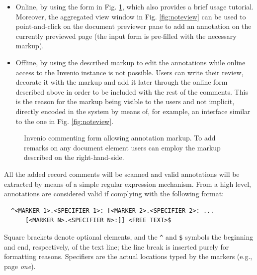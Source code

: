 \begin{itemize}
  \item Online, by using the form in Fig. \ref{fig:noteform}, which also
        provides a brief usage tutorial. Moreover, the aggregated view window in
        Fig. \ref{fig:noteview} can be used to point-and-click on the document
        previewer pane to add an annotation on the currently previewed page (the
        input form is pre-filled with the necessary markup).
  \item Offline, by using the described markup to edit the annotations while
        online access to the Invenio instance is not possible. Users can write
        their review, decorate it with the markup and add it later through the
        online form described above in order to be included with the rest of the
        comments. This is the reason for the markup being visible to the users
        and not implicit, directly encoded in the system by means of, for
        example, an interface similar to the one in Fig. \ref{fig:noteview}.
\end{itemize}

\begin{figure}[!ht]
  \centering
  \caption[Invenio commenting form allowing annotation markup]
          {Invenio commenting form allowing annotation markup. To add remarks
           on any document element users can employ the markup described on the
           right-hand-side.}
  \label{fig:noteform}
\end{figure}

All the added record comments will be scanned and valid annotations will be
extracted by means of a simple regular expression mechanism. From a high level,
annotations are considered valid if complying with the following format:
\begin{verbatim}
  ^<MARKER 1>.<SPECIFIER 1>: [<MARKER 2>.<SPECIFIER 2>: ...
      [<MARKER N>.<SPECIFIER N>:]] <FREE TEXT>$
\end{verbatim}
Square brackets denote optional elements, and the \texttt{\^} and \texttt{\$}
symbols the beginning and end, respectively, of the text line; the line break
is inserted purely for formatting reasons. Specifiers are the actual locations
typed by the markers (e.g., page \textit{one}).

